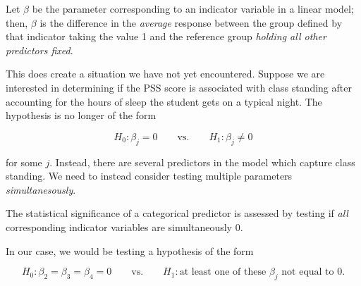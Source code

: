 \documentclass[
  letterpaper,
  DIV=11,
  numbers=noendperiod]{scrreprt}
\theoremstyle{definition}
\theoremstyle{definition}
\theoremstyle{remark}
\begin{document}
\begin{tcolorbox}[enhanced jigsaw, left=2mm, toprule=.15mm, arc=.35mm, breakable, opacitybacktitle=0.6, opacityback=0, rightrule=.15mm, colbacktitle=quarto-callout-note-color!10!white, coltitle=black, leftrule=.75mm, toptitle=1mm, colframe=quarto-callout-note-color-frame, titlerule=0mm, title=\textcolor{quarto-callout-note-color}{\faInfo}\hspace{0.5em}{Interpretation of Coefficient for Indicator}, bottomrule=.15mm, colback=white, bottomtitle=1mm]

Let \(\beta\) be the parameter corresponding to an indicator variable in
a linear model; then, \(\beta\) is the difference in the \emph{average}
response between the group defined by that indicator taking the value 1
and the reference group \emph{holding all other predictors fixed}.

\end{tcolorbox}

This does create a situation we have not yet encountered. Suppose we are
interested in determining if the PSS score is associated with class
standing after accounting for the hours of sleep the student gets on a
typical night. The hypothesis is no longer of the form

\[H_0: \beta_j = 0 \qquad \text{vs.} \qquad H_1: \beta_j \neq 0\]

for some \(j\). Instead, there are several predictors in the model which
capture class standing. We need to instead consider testing multiple
parameters \emph{simultanesously}.

\begin{tcolorbox}[enhanced jigsaw, left=2mm, toprule=.15mm, arc=.35mm, breakable, opacitybacktitle=0.6, opacityback=0, rightrule=.15mm, colbacktitle=quarto-callout-tip-color!10!white, coltitle=black, leftrule=.75mm, toptitle=1mm, colframe=quarto-callout-tip-color-frame, titlerule=0mm, title=\textcolor{quarto-callout-tip-color}{\faLightbulb}\hspace{0.5em}{Big Idea}, bottomrule=.15mm, colback=white, bottomtitle=1mm]

The statistical significance of a categorical predictor is assessed by
testing if \emph{all} corresponding indicator variables are
simultaneously 0.

\end{tcolorbox}

In our case, we would be testing a hypothesis of the form

\[H_0: \beta_2 = \beta_3 = \beta_4 = 0 \qquad \text{vs.} \qquad H_1: \text{at least one of these } \beta_j \text{ not equal to 0}.\]
\end{document}
